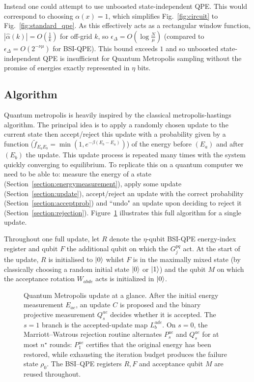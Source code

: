 \begin{remark}
Instead one could attempt to use unboosted state-independent QPE. This would correspond to choosing $\alpha(x)=1$, which simplifies Fig.~\ref{fig:circuit} to Fig.~\ref{fig:standard_qpe}. As this effectively acts as a rectangular window function, $|\hat\alpha(k)| = O(\frac{1}{k})$ for off-grid $k$, so $\epsilon_{\Delta} = O(\log \frac{N}{\mu})$ (compared to $\epsilon_{\Delta} = O(2^{-\nu \mu})$ for BSI-QPE). This bound exceeds $1$ and so unboosted state-independent QPE is insufficient for Quantum Metropolis sampling without the promise of energies exactly represented in $\eta$ bits.
\end{remark}

\subsection{Algorithm}
\label{section:algorithm}
Quantum metropolis is heavily inspired by the classical metropolis-hastings algorithm. The principal idea is to apply a randomly chosen update to the current state then accept/reject this update with a probability given by a function ($\tilde{f}_{E_aE_b}=\min(1, e^{-\beta(E_b-E_a)})$) of the energy before $(E_a)$ and after $(E_b)$ the update. This update process is repeated many times with the system quickly converging to equilibrium. To replicate this on a quantum computer we need to be able to: measure the energy of a state (Section~\ref{section:energymeasurement}), apply some update (Section~\ref{section:update}), accept/reject an update with the correct probability (Section~\ref{section:acceptprob}) and ``undo" an update upon deciding to reject it (Section~\ref{section:rejection}). Figure~\ref{fig:quantum-metropolis-flowchart} illustrates this full algorithm for a single update.


Throughout one full update, let $R$ denote the $\eta$-qubit BSI-QPE energy-index register and qubit $F$ the additional qubit on which the $G_j^{pq}$ act. At the start of the update, $R$ is initialised to $\ket{0}$ whilst $F$ is in the maximally mixed state (by classically choosing a random initial state $\ket{0}$ or $\ket{1}$) and the qubit $M$ on which the acceptance rotation $W_{abde}$ acts is initialized in $\ket{0}$. 
\begin{figure}[t]
  \centering
  
  \caption{Quantum Metropolis update at a glance.  After the initial energy
  measurement $E_{ae}$, an update $C$ is proposed and the binary projective
  measurement $Q^{ae}_{s}$ decides whether it is accepted.  The $s=1$ branch
  is the accepted-update map $L^{ade}_{b}$.  On $s=0$, the
  Marriott--Watrous rejection routine alternates $P^{ae}_{s}$ and
  $Q^{ae}_{s}$ for at most $n^{\star}$ rounds: $P^{ae}_{1}$ certifies that the
  original energy has been restored, while exhausting the iteration budget
  produces the failure state $\rho_{0}$.  The BSI--QPE registers $R,F$ and
  acceptance qubit $M$ are reused throughout.}
  \label{fig:quantum-metropolis-flowchart}
\end{figure}

